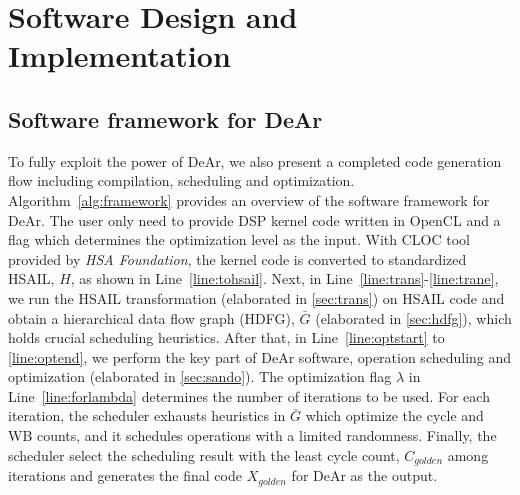 \section{Software Design and Implementation}
\label{cha:software}
\subsection{Software framework for DeAr}
To fully exploit the power of DeAr, we also present a completed code generation flow including compilation, scheduling and optimization.
Algorithm~\ref{alg:framework} provides an overview of the software framework for DeAr. 
The user only need to provide DSP kernel code written in OpenCL and a flag which determines the optimization level as the input.
With CLOC \cite{cloc} tool provided by \textit{HSA Foundation}, the kernel code is converted to standardized HSAIL, $H$, as shown in Line~\ref{line:tohsail}.
Next, in Line~\ref{line:trans}-\ref{line:trane}, 
we run the HSAIL transformation (elaborated in \ref{sec:trans}) on HSAIL code and obtain a hierarchical data flow graph (HDFG), 
$\bar{G}$ (elaborated in \ref{sec:hdfg}), which holds crucial scheduling heuristics.
After that, in Line~\ref{line:optstart} to \ref{line:optend}, we perform the key part of DeAr software, 
operation scheduling and optimization (elaborated in \ref{sec:sando}).
The optimization flag $\lambda$ in Line~\ref{line:forlambda} determines the number of iterations to be used.
For each iteration, the scheduler exhausts heuristics in $\bar{G}$ which optimize the cycle and WB counts, 
and it schedules operations with a limited randomness.
Finally, the scheduler select the scheduling result with the least cycle count, 
$C_{golden}$ among iterations and generates the final code $X_{golden}$ for DeAr as the output.

